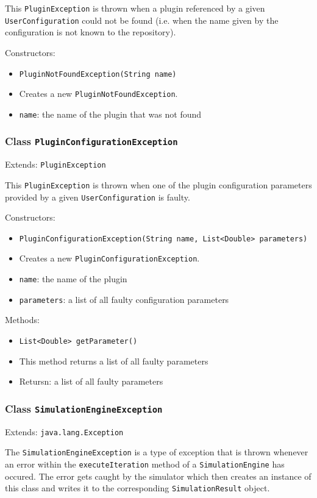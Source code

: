 \documentclass[parskip=full,11pt]{scrartcl}
\begin{document}
This \texttt{PluginException} is thrown when a plugin referenced by a given \texttt{UserConfiguration} could not be found (i.e. when the name given by the configuration is not known to the repository).

Constructors:
\begin{itemize} \itemsep -10pt
	\item \texttt{PluginNotFoundException(String name)}
	\item[] Creates a new \texttt{PluginNotFoundException}.
	\item[] \texttt{name}: the name of the plugin that was not found
\end{itemize}

\subsubsection{Class \texttt{PluginConfigurationException}}
Extends: \texttt{PluginException}

This \texttt{PluginException} is thrown when one of the plugin configuration parameters provided by a given \texttt{UserConfiguration} is faulty.

Constructors:
\begin{itemize}\itemsep -10pt
	\item \texttt{PluginConfigurationException(String name, List<Double> parameters)}
	\item[] Creates a new \texttt{PluginConfigurationException}.
	\item[] \texttt{name}: the name of the plugin
	\item[] \texttt{parameters}: a list of all faulty configuration parameters
\end{itemize}

Methods:
\begin{itemize}\itemsep -10pt
	\item \texttt{List<Double> getParameter()}
	\item[] This method returns a list of all faulty parameters
	\item[] Retursn: a list of all faulty parameters
\end{itemize}

\subsubsection{Class \texttt{SimulationEngineException}}
Extends: \texttt{java.lang.Exception}

The \texttt{SimulationEngineException} is a type of exception that is thrown whenever an error within the \texttt{executeIteration} method of a \texttt{SimulationEngine} has occured. The error gets caught by the simulator which then creates an instance of this class and writes it to the corresponding \texttt{SimulationResult} object.
\end{document}
